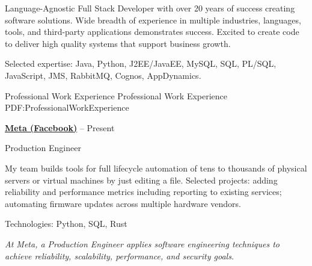 \documentclass[letterpaper,MMMMyyyy,nonstopmode]{simpleresumecv}
\newif\ifLOCATION
\begin{document}
\begin{Body}
Language-Agnostic Full Stack Developer with over 20 years of success creating software solutions.
Wide breadth of experience in multiple industries, languages, tools, and third-party applications demonstrates success.
Excited to create code to deliver high quality systems that support business growth.
\iffalse
\Entry
Full Stack/Backend Java architect, developer, and consultant, specializing in Java/Oracle/JavaScript
solutions and integrations.
\fi
\Gap
Selected expertise: Java, Python, J2EE/JavaEE, MySQL, SQL, PL/SQL, JavaScript, JMS, RabbitMQ, Cognos, AppDynamics.
\iffalse
\Gap
\textit{Business Specialties}: Agile team leadership, customer-focused development, mentoring, requirements gathering and analysis, technical liaison, systems integration, business intelligence
\fi

\Section
{Professional\newline
Work Experience}
{Professional Work Experience}
{PDF:ProfessionalWorkExperience}

\Entry
\href{https://engineering.fb.com/category/production-engineering/}
{\textbf{Meta (Facebook)}}
\hfill
{} --
Present

Production Engineer 
\ifLOCATION
\hfill 
Remote in Rochester, New York
\fi

\begin{Detail}

\BulletItem
My team builds tools for full lifecycle automation of tens to thousands of physical servers or virtual machines by just editing a file.
\BulletItem
Selected projects: adding reliability and performance metrics including reporting to existing services; automating firmware updates across multiple hardware vendors.

\Gap
Technologies: Python, SQL, Rust

\Gap
\textit{At Meta, a Production Engineer applies software engineering techniques to achieve reliability, scalability, performance, and security goals.}


\end{Detail}
\end{Body}
\end{document}
